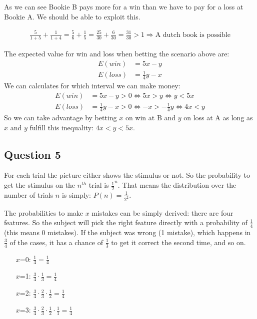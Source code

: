 \documentclass[../main/Notes.tex]{subfiles}
\begin{document}
As we can see Bookie B pays more for a win than we have to pay for a loss at Bookie A. We should be able to exploit this.

\begin{align*}
\frac{5}{1+5}+\frac{1}{1+4} = \frac{5}{6} + \frac{1}{5} = \frac{25}{30} + \frac{6}{30} = \frac{31}{30} > 1 \Rightarrow \text{A dutch book is possible}
\end{align*}

The expected value for win and loss when betting the scenario above are:
\begin{align*}
E(win)  &= 5x-y \\
E(loss) &= \frac{1}{4}y-x
\end{align*}
We can calculates for which interval we can make money:
\begin{align*}
E(win)  &= 5x-y           > 0 \Leftrightarrow 5x>y             \Leftrightarrow y < 5x \\
E(loss) &= \frac{1}{4}y-x > 0 \Leftrightarrow -x>-\frac{1}{4}y \Leftrightarrow 4x < y
\end{align*}
So we can take advantage by betting $x$ on win at B and $y$ on loss at A as long as $x$ and $y$ fulfill this inequality: $4x<y<5x$.



\subsection*{Question 5}
For each trial the picture either shows the stimulus or not. So the probability to get the stimulus on the $n^{th}$ trial is $\frac{1}{2}^n$.
That means the distribution over the number of trials $n$ is simply: $P(n) = \frac{1}{2^2}$.

The probabilities to make $x$ mistakes can be simply derived: there are four features. So the subject will pick the right feature directly with a probability of $\frac{1}{4}$ (this means 0 mistakes). If the subject was wrong (1 mistake), which happens in $\frac{3}{4}$ of the cases, it has a chance of $\frac{1}{3}$ to get it correct the second time, and so on.
\begin{enumerate}
	\item[$x$=0:] $\frac{1}{4} = \frac{1}{4}$ 
	\item[$x$=1:] $\frac{3}{4}\cdot\frac{1}{3} = \frac{1}{4}$ 
	\item[$x$=2:] $\frac{3}{4}\cdot\frac{2}{3}\cdot\frac{1}{2} = \frac{1}{4}$ 
	\item[$x$=3:] $\frac{3}{4}\cdot\frac{2}{3}\cdot\frac{1}{2}\cdot\frac{1}{1} = \frac{1}{4}$ 
\end{enumerate}
\end{document}
